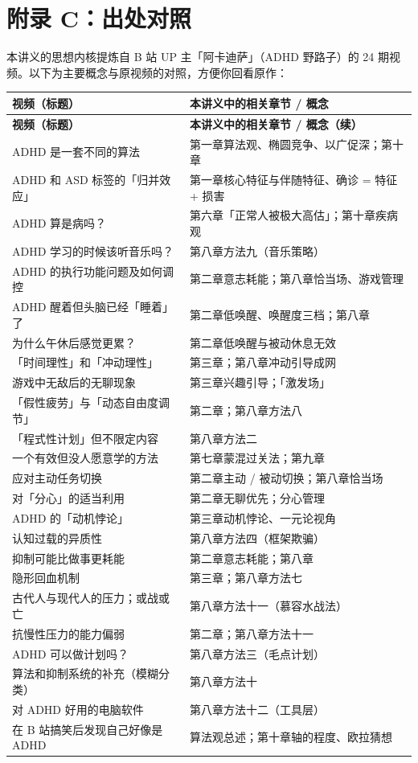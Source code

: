 \clearpage
\section*{附录 C：出处对照}

本讲义的思想内核提炼自 B 站 UP 主「阿卡迪萨」（ADHD 野路子）的 24 期视频。以下为主要概念与原视频的对照，方便你回看原作：

\begin{small}
\begin{longtable}{>{\raggedright\arraybackslash}p{4.2cm} >{\raggedright\arraybackslash}p{11.0cm}}
\toprule
\textbf{视频（标题）} & \textbf{本讲义中的相关章节 / 概念} \\
\midrule
\endfirsthead
\toprule
\textbf{视频（标题）} & \textbf{本讲义中的相关章节 / 概念（续）} \\
\midrule
\endhead
\bottomrule
\endfoot
ADHD 是一套不同的算法 & 第一章算法观、椭圆竞争、以广促深；第十章 \\
ADHD 和 ASD 标签的「归并效应」 & 第一章核心特征与伴随特征、确诊 = 特征 + 损害 \\
ADHD 算是病吗？ & 第六章「正常人被极大高估」；第十章疾病观 \\
ADHD 学习的时候该听音乐吗？ & 第八章方法九（音乐策略） \\
ADHD 的执行功能问题及如何调控 & 第二章意志耗能；第八章恰当场、游戏管理 \\
ADHD 醒着但头脑已经「睡着」了 & 第二章低唤醒、唤醒度三档；第八章 \\
为什么午休后感觉更累？ & 第二章低唤醒与被动休息无效 \\
「时间理性」和「冲动理性」 & 第三章；第八章冲动引导成网 \\
游戏中无敌后的无聊现象 & 第三章兴趣引导；「激发场」 \\
「假性疲劳」与「动态自由度调节」 & 第二章；第八章方法八 \\
「程式性计划」但不限定内容 & 第八章方法二 \\
一个有效但没人愿意学的方法 & 第七章蒙混过关法；第九章 \\
应对主动任务切换 & 第二章主动 / 被动切换；第八章恰当场 \\
对「分心」的适当利用 & 第二章无聊优先；分心管理 \\
ADHD 的「动机悖论」 & 第三章动机悖论、一元论视角 \\
认知过载的异质性 & 第八章方法四（框架欺骗） \\
抑制可能比做事更耗能 & 第二章意志耗能；第八章 \\
隐形回血机制 & 第三章；第八章方法七 \\
古代人与现代人的压力；或战或亡 & 第八章方法十一（慕容水战法） \\
抗慢性压力的能力偏弱 & 第二章；第八章方法十一 \\
ADHD 可以做计划吗？ & 第八章方法三（毛点计划） \\
算法和抑制系统的补充（模糊分类） & 第八章方法十 \\
对 ADHD 好用的电脑软件 & 第八章方法十二（工具层） \\
在 B 站搞笑后发现自己好像是 ADHD & 算法观总述；第十章轴的程度、欧拉猜想 \\
\end{longtable}
\end{small}

